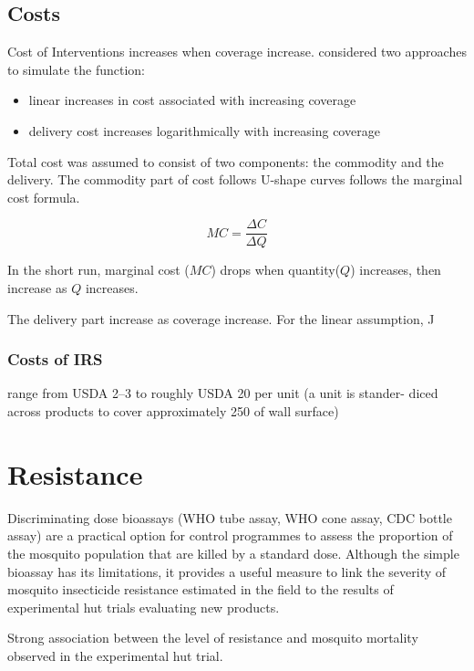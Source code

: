 \documentclass[a4paper, 12pt, twoside]{article}
\begin{document}
\subsection{Costs}
Cost of Interventions increases when coverage increase.\cite{Winskill2017a} considered two approaches to simulate the function:
\begin{itemize}
	\item linear increases in cost associated with increasing coverage
	\item delivery cost increases logarithmically with increasing coverage
\end{itemize}

Total cost was assumed to consist of two components: the commodity and the delivery. The commodity part of cost follows U-shape curves follows the marginal cost formula.

$$ MC = \frac{\Delta C}{\Delta Q} $$

In the short run, marginal cost ($MC$) drops when quantity($Q$) increases, then increase as $Q$ increases.

The delivery part increase as coverage increase. For the linear assumption, J

\subsubsection{Costs of IRS}
range from USDA 2–3 to roughly USDA 20 per unit\cite{Oxborough2016}
(a unit is stander- diced across products to cover approximately 250 of wall surface)

\section{Resistance}

Discriminating dose bioassays (WHO tube assay, WHO cone assay, CDC bottle assay) are a practical option for control programmes to assess the proportion of the mosquito population that are killed by a standard dose.
Although the simple bioassay has its limitations, it provides a useful measure to link the severity of mosquito insecticide resistance estimated in the field to the results of experimental hut trials evaluating new products.

Strong association between the level of resistance and mosquito mortality observed in the experimental hut trial\cite{Sherrard-Smith2018b}.

\end{document}
